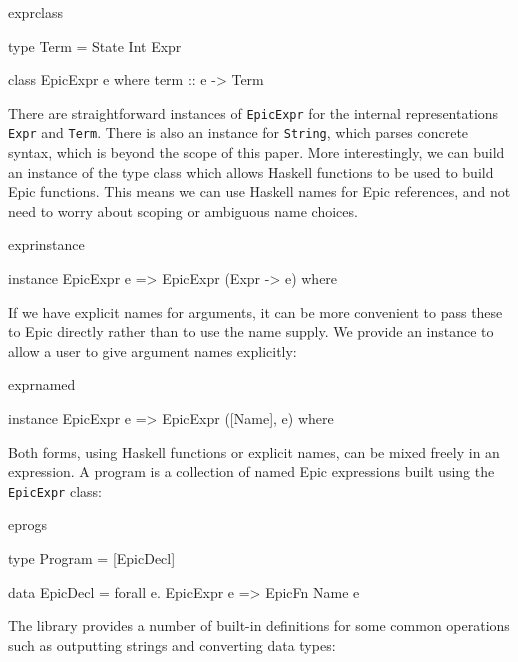 \begin{SaveVerbatim}{exprclass}

type Term = State Int Expr

class EpicExpr e where
    term :: e -> Term

\end{SaveVerbatim}

There are straightforward instances of \texttt{EpicExpr} for the
internal representations \texttt{Expr} and \texttt{Term}. There is also
an instance for \texttt{String}, which parses concrete syntax, which
is beyond the scope of this paper. More interestingly, we can build an
instance of the type class which allows Haskell functions to be used
to build Epic functions.  This means we can use Haskell names for Epic
references, and not need to worry about scoping or ambiguous name
choices. 

\begin{SaveVerbatim}{exprinstance}

instance EpicExpr e => EpicExpr (Expr -> e) where

\end{SaveVerbatim}

\noindent
If we have explicit names for arguments, it can be more convenient to
pass these to Epic directly rather than to use the name supply. We
provide an instance to allow a user to give argument names explicitly:

\begin{SaveVerbatim}{exprnamed}

instance EpicExpr e => EpicExpr ([Name], e) where

\end{SaveVerbatim}

\noindent
Both forms, using Haskell functions or explicit names, can be mixed
freely in an expression. A program is a collection of named Epic
expressions built using the \texttt{EpicExpr} class:

\begin{SaveVerbatim}{eprogs}

type Program = [EpicDecl]

data EpicDecl = forall e. EpicExpr e => EpicFn Name e

\end{SaveVerbatim}

\noindent
The library provides a number of built-in definitions for some common
operations such as outputting strings and converting data types:

